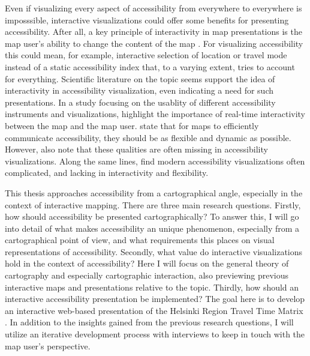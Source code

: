 \documentclass[12pt]{article}
\begin{document}
Even if visualizing every aspect of accessibility from everywhere to everywhere is imposssible,
interactive visualizations could offer some benefits for presenting accessibility.
After all, a key principle of interactivity in map presentations is
the map user's ability to change the content of the map \parencite{rot2013}.
For visualizing accessibility this could mean, for example,
interactive selection of location or travel mode instead of
a static accessibility index that, to a varying extent, tries to account for everything.
Scientific literature on the topic seems support the idea of
interactivity in accessibility visualization, even indicating a need for such presentations.
In a study focusing on the usablity of different accessibility instruments and visualizations,  %
\textcite{te2014} highlight the importance of real-time interactivity between the map and the map user.
\textcite{but2018} state that for maps to efficiently communicate accessibility,
they should be as flexible and dynamic as possible.
However, \citeauthor{but2018} also note that these qualities are often missing in accessibility visualizations.
Along the same lines, \textcite{paj2021} find modern accessibility visualizations often complicated,
and lacking in interactivity and flexibility.

This thesis approaches accessibility from a cartographical angle,
especially in the context of interactive mapping.
There are three main research questions.
Firstly, how should accessibility be presented cartographically?
To answer this, I will go into detail of what makes accessibility an unique phenomenon,
especially from a cartographical point of view,
and what requirements this places on visual representations of accessibility.
Secondly, what value do interactive visualizations hold in the context of accessibility?
Here I will focus on the general theory of cartography and especially cartographic interaction,
also previewing previous interactive maps and presentations relative to the topic.
Thirdly, how should an interactive accessibility presentation be implemented?
The goal here is to develop an interactive web-based presentation of the
Helsinki Region Travel Time Matrix \parencite{ten2020}.
In addition to the insights gained from the previous research questions,
I will utilize an iterative development process with interviews
to keep in touch with the map user's perspective.
\end{document}
